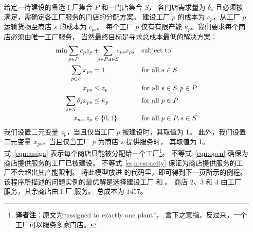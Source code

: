 给定一待建设的备选工厂集合 $P$ 和一门店集合 $S$，
各门店需求量为 $\delta_s$ 且必须被满足，需确定各工厂服务的门店的分配方案。
建设工厂 $p$ 的成本为 $c_p$，从工厂 $p$ 运输货物至商店 $s$ 的成本为 $c_{ps}$。
每个工厂 $p$ 仅有有限产能 $\kappa_p$。我们要求每个商店必须由唯一工厂服务，
当然最终目标是寻求总成本最低的解决方案：
%
\begin{align}
\min\sum_{p\in P}c_p z_p&
   +\!\!\!\sum_{p\in P, s\in S}\!\!\!c_{ps} x_{ps}&&\mbox{subject to}\nonumber\\
\sum_{p\in P} x_{ps}& = 1&&\text{for all } s\in S\label{eqn:assign}\\
x_{ps}&\leq z_{p}&&\text{for all } s\in S, p\in P\label{eqn:open}\\
\sum_{s\in S} \delta_s x_{ps}&\leq\kappa_p&&\text{for all } p\in P\label{eqn:capacity}\\
x_{ps},z_p&\in\{0,1\}&&\text{for all } p\in P, s\in S\nonumber
\end{align}
%
我们设置二元变量 $z_p$，当且仅当工厂 $p$ 被建设时，其取值为 1。
此外，我们设置二元变量 $x_{ps}$，当且仅当工厂 $p$ 为商店 $s$ 提供服务时，
其取值为 1。
式~\eqref{eqn:assign} 表示每个商店只能被分配给一个工厂\footnote{
  \textbf{译者注}：原文为“assigned to exactly one plant”，
  言下之意指，反过来，一个工厂可以服务多家门店。
}。
不等式~\eqref{eqn:open} 确保为商店提供服务的工厂已被建设。
不等式~\eqref{eqn:capacity} 保证为商店提供服务的工厂不会超出其产能限制。
将此模型放进 \zimpl 的代码里，即可得到下一页所示的例程。
该程序所描述的问题实例的最优解是选择建设工厂  和 。
商店 2、3 和 4 由工厂  服务，其余商店由工厂  服务。
总成本为 1457。

